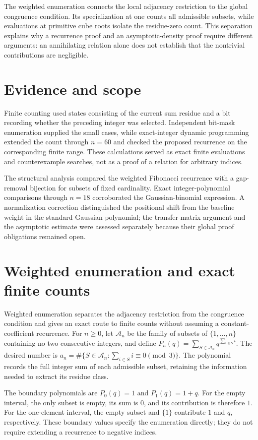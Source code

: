 \documentclass[11pt]{article}
\begin{document}
The weighted enumeration connects the local adjacency restriction to the global congruence condition. Its specialization at one counts all admissible subsets, while evaluations at primitive cube roots isolate the residue-zero count. This separation explains why a recurrence proof and an asymptotic-density proof require different arguments: an annihilating relation alone does not establish that the nontrivial contributions are negligible.

\section{Evidence and scope}
Finite counting used states consisting of the current sum residue and a bit recording whether the preceding integer was selected. Independent bit-mask enumeration supplied the small cases, while exact-integer dynamic programming extended the count through $n=60$ and checked the proposed recurrence on the corresponding finite range. These calculations served as exact finite evaluations and counterexample searches, not as a proof of a relation for arbitrary indices.

The structural analysis compared the weighted Fibonacci recurrence with a gap-removal bijection for subsets of fixed cardinality. Exact integer-polynomial comparisons through $n=18$ corroborated the Gaussian-binomial expression. A normalization correction distinguished the positional shift from the baseline weight in the standard Gaussian polynomial; the transfer-matrix argument and the asymptotic estimate were assessed separately because their global proof obligations remained open.

\section{Weighted enumeration and exact finite counts}
Weighted enumeration separates the adjacency restriction from the congruence condition and gives an exact route to finite counts without assuming a constant-coefficient recurrence. For $n\geq 0$, let $\mathcal A_n$ be the family of subsets of $\{1,\ldots,n\}$ containing no two consecutive integers, and define $P_n(q)=\sum_{S\in\mathcal A_n}q^{\sum_{i\in S}i}$. The desired number is $a_n=\#\{S\in\mathcal A_n:\sum_{i\in S}i\equiv0\pmod 3\}$. The polynomial records the full integer sum of each admissible subset, retaining the information needed to extract its residue class.

The boundary polynomials are $P_0(q)=1$ and $P_1(q)=1+q$. For the empty interval, the only subset is empty, its sum is $0$, and its contribution is therefore $1$. For the one-element interval, the empty subset and $\{1\}$ contribute $1$ and $q$, respectively. These boundary values specify the enumeration directly; they do not require extending a recurrence to negative indices.
\end{document}
